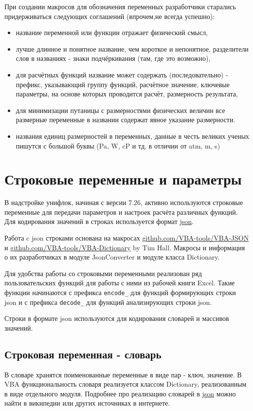 При создании макросов для обозначения переменных разработчики старались придерживаться следующих соглашений (впрочем,не всегда успешно):
\begin{itemize}
	\item название переменной или функции отражает физический смысл,
	\item лучше длинное и понятное название, чем короткое и непонятное, разделители слов в названиях - знаки подчёркивания (там, где это возможно),
	\item для расчётных функций название может содержать (последовательно) - префикс, указывающий группу функций, расчётное значение, ключевые параметры, на основе которых проводится расчёт, размерность результата,
	\item для минимизации путаницы с размерностями физических величин все размерные переменные в названии содержат явное указание размерности.
	\item названия единиц размерностей в переменных, данные в честь великих ученых пишутся с большой буквы (Pa, W, cP и тд, в отличии от atm, m, s) 
\end{itemize}

\section{Строковые переменные и параметры}
В надстройке унифлок, начиная с версии 7.26, активно используются строковые переменные для передачи параметров и настроек расчёта различных функций. Для кодирования значений в строках используется формат  \href{https://ru.wikipedia.org/wiki/JSON}{json}. 

Работа c json строками основана на макросах \href{https://github.com/VBA-tools/VBA-JSON}{github.com/VBA-tools/VBA-JSON} и \href{https://github.com/VBA-tools/VBA-Dictionary}{github.com/VBA-tools/VBA-Dictionary} by Tim Hall. Макросы и информация о их разработчиках в модуле JsonConverter и модуле класса Dictionary.

Для удобства работы со строковыми переменными реализован ряд пользовательских функций для работы с ними из рабочей книги Excel. Такие функции начинаются с префикса \texttt{encode_} для функций формирующих строки json и с префикса \texttt{decode_} для функций анализирующих строки json.

Строки в формате json используются для кодирования словарей и массивов значений.
\subsection{Строковая переменная - словарь}
В словаре хранятся поименованные переменные в виде пар - ключ, значение. В VBA функциональность словаря реализуется классом Dictionary, реализованным в виде отдельного модуля. Подробнее про реализацию словарей в \href{https://ru.wikipedia.org/wiki/JSON}{json} можно найти в википедии или других источниках в интернете.

